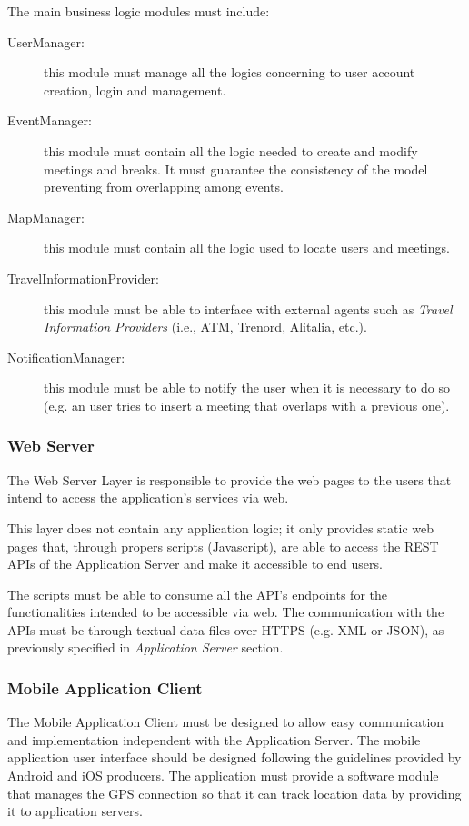 \documentclass{article}
\begin{document}
	\bigskip
	The main business logic modules must include:

	\begin{description}
	\item [UserManager:] this module must manage all the logics concerning to user account creation, login and management.
	\item [EventManager:] this module must contain all the logic needed to create and modify meetings and breaks. It must guarantee the consistency of the model preventing from overlapping among events. 
	\item [MapManager:] this module must contain all the logic used to locate users and meetings. 
	\item [TravelInformationProvider:] this module must be able to interface with external agents such as \textit{Travel Information Providers} (i.e., ATM, Trenord, Alitalia, etc.).
	\item [NotificationManager:] this module must be able to notify the user when it is necessary to do so (e.g. an user tries to insert a meeting that overlaps with a previous one).
	\end{description}


	\subsubsection{Web Server}
	The Web Server Layer is responsible to provide the web pages to the users that intend to access the application's services via web.
	
	\bigskip
	This layer does not contain any application logic; it only provides static web pages that, through propers scripts (Javascript), are able to access the REST APIs of the Application Server and make it accessible to end users.

	\bigskip
	The scripts must be able to consume all the API's endpoints for the functionalities intended to be accessible via web.
	The communication with the APIs must be through textual data files over HTTPS (e.g. XML or JSON), as previously specified in \textit{Application Server} section.


	\subsubsection{Mobile Application Client}
	The Mobile Application Client must be designed to allow easy communication and implementation independent with the Application Server.
	The mobile application user interface should be designed following the guidelines provided by Android and iOS producers.
	The application must provide a software module that manages the GPS connection so that it can track location data by providing it to application servers.
\end{document}
